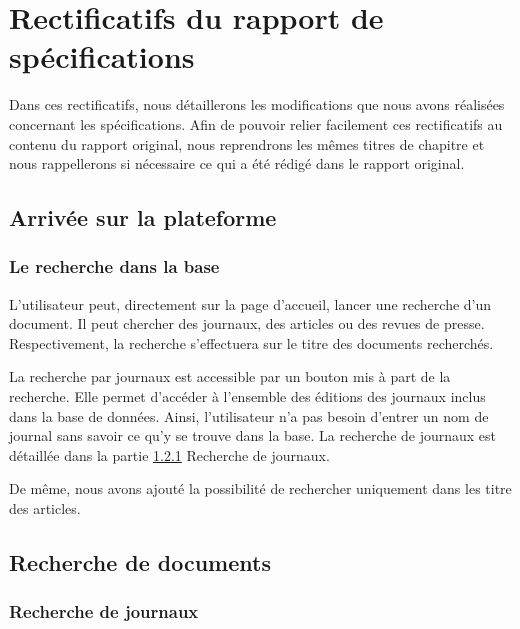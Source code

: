 \section{Rectificatifs du rapport de spécifications}
\label{sec:majspec}

Dans ces rectificatifs, nous détaillerons les modifications que nous avons réalisées concernant les spécifications\cite{Specs}. Afin de pouvoir relier facilement ces rectificatifs au contenu du rapport original, nous reprendrons les mêmes titres de chapitre et nous rappellerons si nécessaire ce qui a été rédigé dans le rapport original. 

\subsection{Arrivée sur la plateforme}

\subsubsection{Le recherche dans la base}

\begin{leftonly}

L'utilisateur peut, directement sur la page d'accueil, lancer une recherche d'un document. Il peut chercher des journaux, des articles ou des revues de presse. Respectivement, la recherche s'effectuera sur le titre des documents recherchés.

\end{leftonly}

La recherche par journaux est accessible par un bouton mis à part de la recherche. Elle permet d'accéder à l'ensemble des éditions des journaux inclus dans la base de données. Ainsi, l'utilisateur n'a pas besoin d'entrer un nom de journal sans savoir ce qu'y se trouve dans la base. La recherche de journaux est détaillée dans la partie \ref{sec:rechjour} Recherche de journaux. 

De même, nous avons ajouté la possibilité de rechercher uniquement dans les titre des articles.

\subsection{Recherche de documents}

\subsubsection{Recherche de journaux}
\label{sec:rechjour}

